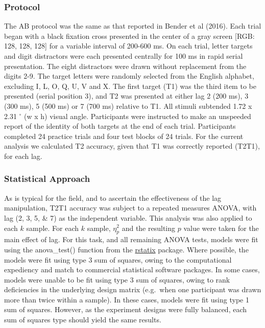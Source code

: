 \documentclass{article}
\begin{document}
\hypertarget{protocol}{%
\subsubsection{Protocol}\label{protocol}}

The AB protocol was the same as that reported in Bender et al (2016). Each trial began with a black fixation cross presented in the center of a gray screen {[}RGB: 128, 128, 128{]} for a variable interval of 200-600 ms. On each trial, letter targets and digit distractors were each presented centrally for 100 ms in rapid serial presentation. The eight distractors were drawn without replacement from the digits 2-9. The target letters were randomly selected from the English alphabet, excluding I, L, O, Q, U, V and X. The first target (T1) was the third item to be presented (serial position 3), and T2 was presented at either lag 2 (200 ms), 3 (300 ms), 5 (500 ms) or 7 (700 ms) relative to T1. All stimuli subtended 1.72 x 2.31 \(^\circ\) (w x h) visual angle. Participants were instructed to make an unspeeded report of the identity of both targets at the end of each trial. Participants completed 24 practice trials and four test blocks of 24 trials. For the current analysis we calculated T2 accuracy, given that T1 was correctly reported (T2\textbar T1), for each lag.

\hypertarget{statistical-approach}{%
\subsubsection{Statistical Approach}\label{statistical-approach}}

As is typical for the field, and to ascertain the effectiveness of the lag manipulation, T2\textbar T1 accuracy was subject to a repeated measures ANOVA, with lag (2, 3, 5, \& 7) as the independent variable. This analysis was also applied to each \(k\) sample. For each \(k\) sample, \(\eta_{p}^2\) and the resulting \(p\) value were taken for the main effect of lag. For this task, and all remaining ANOVA tests, models were fit using the anova\_test() function from the \href{https://rpkgs.datanovia.com/rstatix/index.html}{rstatix} package. Where possible, the models were fit using type 3 sum of squares, owing to the computational expediency and match to commercial statistical software packages. In some cases, models were unable to be fit using type 3 sum of squares, owing to rank deficiencies in the underlying design matrix (e.g.~when one participant was drawn more than twice within a sample). In these cases, models were fit using type 1 sum of squares. However, as the experiment designs were fully balanced, each sum of squares type should yield the same results.
\end{document}

